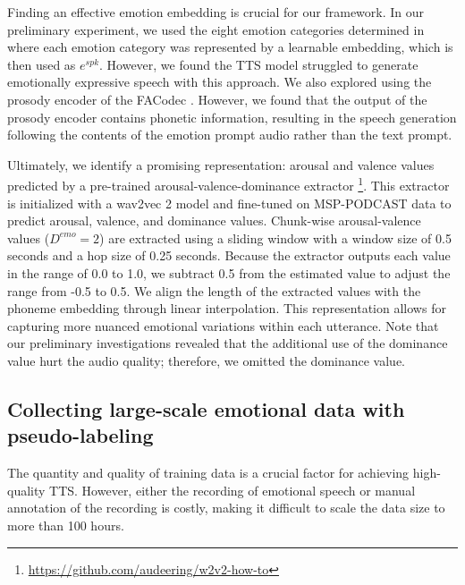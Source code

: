 Finding an effective emotion embedding is crucial for our framework. 
In our preliminary experiment,
we used the eight emotion categories determined in \cite{lotfian2017building}
where each emotion category was represented by a learnable embedding,
which is then used as $e^{spk}$.
However, we found the TTS model struggled to generate emotionally expressive speech with this approach. 
We also explored using the prosody encoder of the FACodec \cite{ju2024naturalspeech}. However, we found that the output of the prosody encoder contains phonetic information, resulting in the speech generation following the contents of the emotion prompt audio rather than the text prompt.

Ultimately, we identify a promising representation: arousal and valence values
predicted by a pre-trained arousal-valence-dominance extractor \cite{wagner2023dawn}\footnote{\label{fn:aro-val}\url{https://github.com/audeering/w2v2-how-to}}. 
This extractor is initialized with a wav2vec 2 model \cite{baevski2020wav2vec} and fine-tuned on MSP-PODCAST data \cite{lotfian2017building} to predict arousal, valence, and dominance values. 
Chunk-wise arousal-valence values ($D^{emo}=2$) are extracted using a sliding window with a window size of 0.5 seconds and a hop size of 0.25 seconds. 
Because the extractor outputs each value in the range of 0.0 to 1.0, we subtract 0.5 from the estimated value to adjust the range from -0.5 to 0.5.
We align the length of the extracted values with the phoneme embedding through linear interpolation.
This representation allows for capturing more nuanced emotional variations within each utterance.
Note that 
our preliminary investigations revealed that the additional use of the dominance value hurt the audio quality; therefore, we omitted the dominance value.

\vspace{-.5em}
\subsection{Collecting large-scale emotional data with pseudo-labeling}
\label{ssec:data}
\vspace{-.5em}

The quantity and quality of training data is a crucial factor for achieving high-quality TTS. 
However, either the recording of emotional speech or manual annotation of the recording is costly, making it difficult to scale the data size to more than 100 hours.

